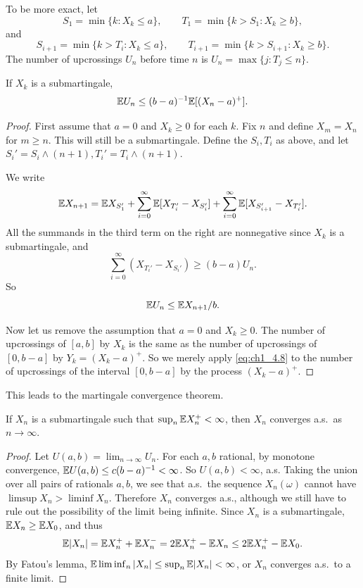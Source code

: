 To be more exact, let
\[
    S_1 = \min\{k : X_k \leq a\}, \qquad T_1 = \min\{k > S_1 : X_k \geq b\},
\]
and
\[
    S_{i+1} = \min\{k > T_i : X_k \leq a\}, \qquad T_{i+1} = \min\{k > S_{i+1} : X_k \geq b\}.
\]
The number of upcrossings $U_n$ before time $n$ is $U_n = \max\{j : T_j \leq n\}$.

\mpagebreak

\begin{theorem}\label{thm:ch1_4.11}
If $X_k$ is a submartingale,
\[
    \mathbb{E} U_n \leq (b-a)^{-1}\mathbb{E}[(X_n - a)^+].
\]
\end{theorem}

\begin{proof}
First assume that $a = 0$ and $X_k \geq 0$ for each $k$. Fix $n$ and define $X_m = X_n$ for $m \geq n$. This will still be a submartingale. Define the $S_i, T_i$ as above, and let $S_i' = S_i \wedge (n+1), T_i' = T_i \wedge (n+1)$.

We write
\[
    \mathbb{E} X_{n+1} = \mathbb{E} X_{S_1'} + \sum_{i=0}^{\infty}\mathbb{E}[X_{T_i'} - X_{S_i'}] + \sum_{i=0}^{\infty}\mathbb{E}[X_{S_{i+1}'} - X_{T_i'}].
\]
All the summands in the third term on the right are nonnegative since $X_k$ is a submartingale, and
\[
    \sum_{i=0}^{\infty}(X_{T_i'} - X_{S_i'}) \geq (b-a)U_n.
\]
So
\begin{equation}\label{eq:ch1_4.8}
    \mathbb{E} U_n \leq \mathbb{E} X_{n+1}/b.
\end{equation}

Now let us remove the assumption that $a = 0$ and $X_k \geq 0$. The number of upcrossings of $[a,b]$ by $X_k$ is the same as the number of upcrossings of $[0,b-a]$ by $Y_k = (X_k - a)^+$. So we merely apply \eqref{eq:ch1_4.8} to the number of upcrossings of the interval $[0,b-a]$ by the process $(X_k - a)^+$.
\end{proof}

This leads to the martingale convergence theorem.

\begin{theorem}\label{thm:ch1_4.12}
If $X_n$ is a submartingale such that $\sup_n \mathbb{E} X_n^+ < \infty$, then $X_n$ converges a.s.\ as $n \to \infty$.
\end{theorem}

\begin{proof}
Let $U(a,b) = \lim_{n\to\infty} U_n$. For each $a,b$ rational, by monotone convergence, $\mathbb{E} U(a,b) \leq c(b-a)^{-1} < \infty$. So $U(a,b) < \infty$, a.s. Taking the union over all pairs of rationals $a,b$, we see that a.s.\ the sequence $X_n(\omega)$ cannot have $\limsup X_n > \liminf X_n$. Therefore $X_n$ converges a.s., although we still have to rule out the possibility of the limit being infinite. Since $X_n$ is a submartingale, $\mathbb{E} X_n \geq \mathbb{E} X_0$, and thus
\[
    \mathbb{E}|X_n| = \mathbb{E} X_n^+ + \mathbb{E} X_n^- = 2\mathbb{E} X_n^+ - \mathbb{E} X_n \leq 2\mathbb{E} X_n^+ - \mathbb{E} X_0.
\]
By Fatou's lemma, $\mathbb{E} \liminf_n |X_n| \leq \sup_n \mathbb{E}|X_n| < \infty$, or $X_n$ converges a.s.\ to a finite limit.
\end{proof}

